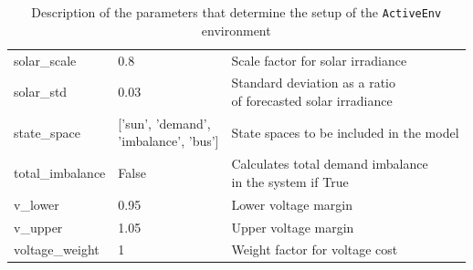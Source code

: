 \documentclass[class=book, crop=false]{standalone}
\begin{document}
{\begin{table}[ht]
\begin{tabular}{lll}
solar\_scale       & 0.8                                                  & Scale factor for solar irradiance                            \\
solar\_std         & 0.03                                                 & \makecell[l]{Standard deviation as a ratio \\ of forecasted solar irradiance} \\
state\_space       & \makecell[l]{{[}’sun’, ’demand’, \\ ’imbalance’, 'bus'{]}}            & State spaces to be included in the model                     \\
total\_imbalance   & False                                                & \makecell[l]{Calculates total demand imbalance \\ in the system if True}      \\
v\_lower           & 0.95                                                 & Lower voltage margin                                         \\
v\_upper           & 1.05                                                 & Upper voltage margin                                         \\
voltage\_weight    & 1                                                    & Weight factor for voltage cost                              \\
\hline
\end{tabular}
\caption{Description of the parameters that determine the setup of the \texttt{ActiveEnv} environment}
\label{table:implementation:param_description}
\end{table}
}
\end{document}
